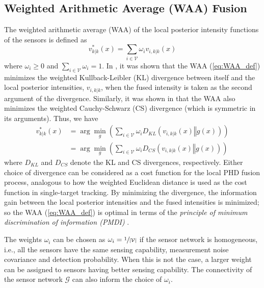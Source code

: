 \subsection{Weighted Arithmetic Average (WAA) Fusion}
The weighted arithmetic average (WAA) of the local posterior intensity functions of the sensors is defined as
\begin{equation}
    v^{*}_{k|k}(x) = \sum_{i \in \mathcal V} \omega_i v_{i,k|k}(x)
    \label{eq:WAA_def}
\end{equation}
where $\omega_i \geq 0$ and $\sum_{i\in \mathcal V} \omega_i = 1$. In \cite{da2020kullback}, it was shown that the WAA (\ref{eq:WAA_def}) minimizes the weighted Kullback-Leibler (KL) divergence between itself and the local posterior intensities, $v_{i,k|k}$, when the fused intensity is taken as the second argument of the divergence. Similarly, it was shown in \cite{gostar2017cauchy} that the WAA also minimizes the weighted Cauchy-Schwarz (CS) divergence (which is symmetric in its arguments). Thus, we have
\begin{align}
    v^{*}_{k|k}(x) &= \arg \min_{g} \left( \sum_{i\in \mathcal V} \omega_i D_{KL}\left(v_{i,k|k}(x)\mathrel{\Vert}g(x)\right)\right) \\&= \arg \min_{g}\left( \sum_{i\in \mathcal V} \omega_i D_{CS}\left(v_{i,k|k}(x)\mathrel{\Vert}g(x)\right)\right)
    \label{eq:csd}
\end{align}
where $D_{KL}$ and $D_{CS}$ denote the KL and CS divergences, respectively.
Either choice of divergence can be considered as a cost function for the local PHD fusion process, analogous to how the weighted Euclidean distance is used as the cost function in single-target tracking. By minimizing the divergence, the information gain between the local posterior intensities and the fused intensities is minimized; so the WAA (\ref{eq:WAA_def}) is optimal in terms of the \textit{principle of minimum discrimination of information (PMDI)} \cite{gostar2017cauchy, gao2020multiobject}.

The weights $\omega_i$ can be chosen as $\omega_i =\sfrac{1}{|\mathcal V|}$ if the sensor network is homogeneous, i.e., all the sensors have the same sensing capability, measurement noise covariance and detection probability. When this is not the case, a larger weight can be assigned to sensors having better sensing capability. The connectivity of the sensor network $\mathcal G$ can also inform the choice of $\omega _i$. 

